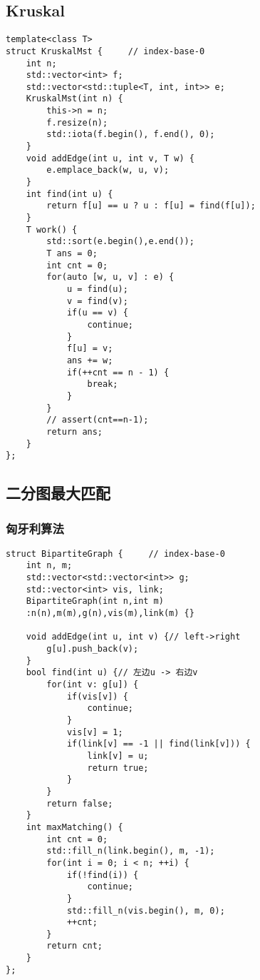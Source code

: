 \subsection{Kruskal}
\begin{lstlisting}
template<class T>
struct KruskalMst {		// index-base-0
    int n;
    std::vector<int> f;
    std::vector<std::tuple<T, int, int>> e;
    KruskalMst(int n) {
		this->n = n;
		f.resize(n);
		std::iota(f.begin(), f.end(), 0);
	}
    void addEdge(int u, int v, T w) {
        e.emplace_back(w, u, v);
    }
    int find(int u) {
        return f[u] == u ? u : f[u] = find(f[u]);
    }
    T work() {
        std::sort(e.begin(),e.end());
        T ans = 0;
        int cnt = 0;
		for(auto [w, u, v] : e) {
			u = find(u);
			v = find(v);
			if(u == v) {
				continue;
			}
			f[u] = v;
			ans += w;
			if(++cnt == n - 1) {
				break;
			}
		}
        // assert(cnt==n-1);
        return ans;
    }
};
\end{lstlisting}


\subsection{二分图最大匹配}
\subsubsection{匈牙利算法}
\begin{lstlisting}
struct BipartiteGraph {		// index-base-0
    int n, m;
    std::vector<std::vector<int>> g;
    std::vector<int> vis, link;
    BipartiteGraph(int n,int m)
	:n(n),m(m),g(n),vis(m),link(m) {}

    void addEdge(int u, int v) {// left->right
        g[u].push_back(v);
    }
    bool find(int u) {// 左边u -> 右边v
        for(int v: g[u]) {
            if(vis[v]) {
				continue;
			}
            vis[v] = 1;
            if(link[v] == -1 || find(link[v])) {
                link[v] = u;
                return true;
            }
        }
        return false;
    }
    int maxMatching() {
        int cnt = 0;
        std::fill_n(link.begin(), m, -1);
        for(int i = 0; i < n; ++i) {
            if(!find(i)) {
				continue;
			}
            std::fill_n(vis.begin(), m, 0);
            ++cnt;
        }
        return cnt;
    }
};
\end{lstlisting}


